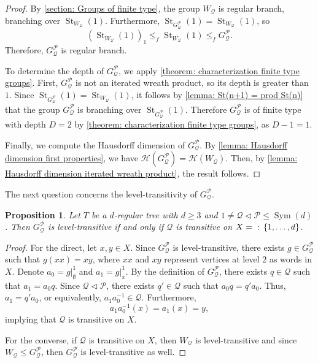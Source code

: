 \documentclass{amsart}
\def\set#1{{\def\st{\;:\;}\left\{#1\right\}}}
\DeclareMathOperator{\St}{St}
\DeclareMathOperator{\Sym}{Sym}
\DeclareMathOperator{\st}{st}
\newtheorem{Proposition}{Proposition}[section]
\begin{document}
\begin{proof}
By \cref{section: Groups of finite type}, the group $W_\mathcal{Q}$ is regular branch, branching over $\St_{W_\mathcal{Q}}(1)$. Furthermore, $\St_{G_\mathcal{Q}^\mathcal{P}}(1) = \St_{W_\mathcal{Q}}(1)$, so $$(\St_{W_\mathcal{Q}}(1))_1 \leq_f \St_{W_\mathcal{Q}}(1) \leq_f G_\mathcal{Q}^\mathcal{P}.$$ Therefore, $G_\mathcal{Q}^\mathcal{P}$ is regular branch.

To determine the depth of $G_\mathcal{Q}^\mathcal{P}$, we apply \cref{theorem: characterization finite type groups}. First, $G_\mathcal{Q}^\mathcal{P}$ is not an iterated wreath product, so its depth is greater than $1$. Since $\St_{G_\mathcal{Q}^\mathcal{P}}(1) = \St_{W_\mathcal{Q}}(1)$, it follows by \cref{lemma: St(n+1) = prod St(n)} that the group $G_\mathcal{Q}^\mathcal{P}$ is branching over $\St_{G_\mathcal{Q}^\mathcal{P}}(1)$. Therefore $G_\mathcal{Q}^\mathcal{P}$ is of finite type with depth $D = 2$ by \cref{theorem: characterization finite type groups}, as $D-1 = 1$.

Finally, we compute the Hausdorff dimension of $G_\mathcal{Q}^\mathcal{P}$. By \cref{lemma: Hausdorff dimension first properties}, we have $\mathcal{H}(G_\mathcal{Q}^\mathcal{P}) = \mathcal{H}(W_{\mathcal{Q}})$. Then, by \cref{lemma: Hausdorff dimension iterated wreath product}, the result follows.
\end{proof}

The next question concerns the level-transitivity of $G_\mathcal{Q}^\mathcal{P}$. 

\begin{Proposition}
Let $T$ be a $d$-regular tree with $d \geq 3$ and $1 \neq \mathcal{Q} \lhd \mathcal{P} \leq \Sym(d)$. Then $G_\mathcal{Q}^\mathcal{P}$ is level-transitive if and only if $\mathcal{Q}$ is transitive on $X = \set{1, \dots,d}$. 
\label{proposition: GQP level transitive}
\end{Proposition}

\begin{proof}
For the direct, let $x,y \in X$. Since $G_\mathcal{Q}^\mathcal{P}$ is level-transitive, there exists $g \in G_\mathcal{Q}^\mathcal{P}$ such that $g(xx) = xy$, where $xx$ and $xy$ represent vertices at level $2$ as words in $X$. Denote $a_0 = g|_\emptyset^1$ and $a_1 = g|_x^1$. By the definition of $G_\mathcal{Q}^\mathcal{P}$, there exists $q \in \mathcal{Q}$ such that $a_1 = a_0 q$. Since $\mathcal{Q} \lhd \mathcal{P}$, there exists $q' \in \mathcal{Q}$ such that $a_0 q = q' a_0$. Thus, $a_1 = q' a_0$, or equivalently, $a_1 a_0^{-1} \in \mathcal{Q}$. Furthermore, $$a_1 a_0^{-1}(x) = a_1(x) = y,$$ implying that $\mathcal{Q}$ is transitive on $X$.

For the converse, if $\mathcal{Q}$ is transitive on $X$, then $W_\mathcal{Q}$ is level-transitive and since $W_\mathcal{Q} \leq G_\mathcal{Q}^\mathcal{P}$, then $G_\mathcal{Q}^\mathcal{P}$ is level-transitive as well. 
\end{proof}
\end{document}
